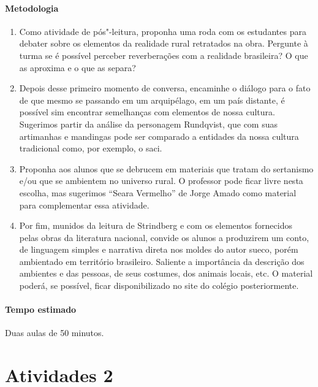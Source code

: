 \documentclass[12pt]{extarticle}
\begin{document}
\paragraph{Metodologia}

\begin{enumerate}

\item
Como atividade de pós"-leitura, proponha uma roda com os estudantes para debater sobre os
elementos da realidade rural retratados na obra. Pergunte à turma se é possível perceber 
reverberações com a realidade brasileira? O que as aproxima e o que as separa? 

\item
Depois desse primeiro momento de conversa, encaminhe o diálogo para o fato de que mesmo se passando
em um arquipélago, em um país distante, é possível sim encontrar semelhanças 
com elementos de nossa cultura. 
Sugerimos partir da análise da personagem Rundqvist, que com suas artimanhas e mandingas pode ser 
comparado a entidades da nossa cultura tradicional como, por exemplo, o saci. 

\item
Proponha aos alunos que se debrucem em materiais que tratam do
sertanismo e/ou que se ambientem no universo rural. 
O professor pode ficar livre nesta escolha, mas sugerimos ``Seara Vermelho'' de Jorge Amado como material 
para complementar essa atividade. 

\item
Por fim, munidos da leitura de Strindberg e com os elementos fornecidos pelas obras da literatura
nacional, convide os alunos a produzirem um conto, de linguagem simples
e narrativa direta nos moldes do autor sueco, porém ambientado em
território brasileiro. 
Saliente a importância da descrição dos ambientes e das pessoas, de seus costumes, dos animais locais, 
etc. O material poderá, se possível, ficar disponibilizado no site do colégio posteriormente.

\end{enumerate}


\paragraph{Tempo estimado} Duas aulas de 50 minutos.


\section{Atividades 2}
\end{document}
